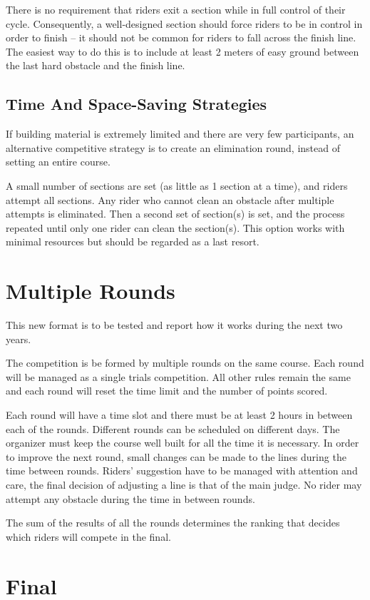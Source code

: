 There is no requirement that riders exit a section while in full control of their cycle.
Consequently, a well-designed section should force riders to be in control in order to finish -- it should not be common for riders to fall across the finish line.
The easiest way to do this is to include at least 2 meters of easy ground between the last hard obstacle and the finish line.

\subsection{Time And Space-Saving Strategies}
If building material is extremely limited and there are very few participants, an alternative competitive strategy is to create an elimination round, instead of setting an entire course.

A small number of sections are set (as little as 1 section at a time), and riders attempt all sections.
Any rider who cannot clean an obstacle after multiple attempts is eliminated.
Then a second set of section(s) is set, and the process repeated until only one rider can clean the section(s).
This option works with minimal resources but should be regarded as a last resort.

\section{Multiple Rounds}
This new format is to be tested and report how it works during the next two years.

The competition is be formed by multiple rounds on the same course.
Each round will be managed as a single trials competition.
All other rules remain the same and each round will reset the time limit and the number of points scored.

Each round will have a time slot and there must be at least 2 hours in between each of the rounds.
Different rounds can be scheduled on different days.
The organizer must keep the course well built for all the time it is necessary.
In order to improve the next round, small changes can be made to the lines during the time between rounds.
Riders' suggestion have to be managed with attention and care, the final decision of adjusting a line is that of the main judge.
No rider may attempt any obstacle during the time in between rounds.

The sum of the results of all the rounds determines the ranking that decides which riders will compete in the final.

\section{Final}

